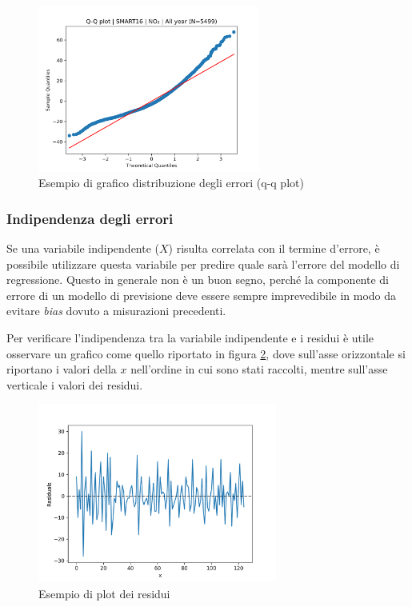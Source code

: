 \begin{figure}[H]
\centering
\includegraphics[width=0.65\textwidth,height=\textheight,keepaspectratio]{img/res_no2_qq}
\caption{Esempio di grafico distribuzione degli errori (q-q plot)}
\label{fig:distr_errori}
\end{figure}

\subsubsection{Indipendenza degli errori}\label{ssec:correlazione-errore-variabili}
Se una variabile indipendente ($X$) risulta correlata con il termine d’errore, è possibile utilizzare questa variabile per predire quale sarà l’errore del modello di regressione. Questo in generale non è un buon segno, perché la componente di errore di un modello di previsione deve essere sempre imprevedibile in modo da evitare \textit{bias} dovuto a misurazioni precedenti.

Per verificare l'indipendenza tra la variabile indipendente e i residui è utile osservare un grafico come quello riportato in figura \ref{fig:residui-plot}, dove sull’asse orizzontale si riportano i valori della $x$ nell'ordine in cui sono stati raccolti, mentre sull’asse verticale i valori dei residui.

\begin{figure}[H]
\centering
\includegraphics[width=0.70\textwidth,height=\textheight,keepaspectratio]{img/residual_plot}
\caption{Esempio di plot dei residui}
\label{fig:residui-plot}
\end{figure}

